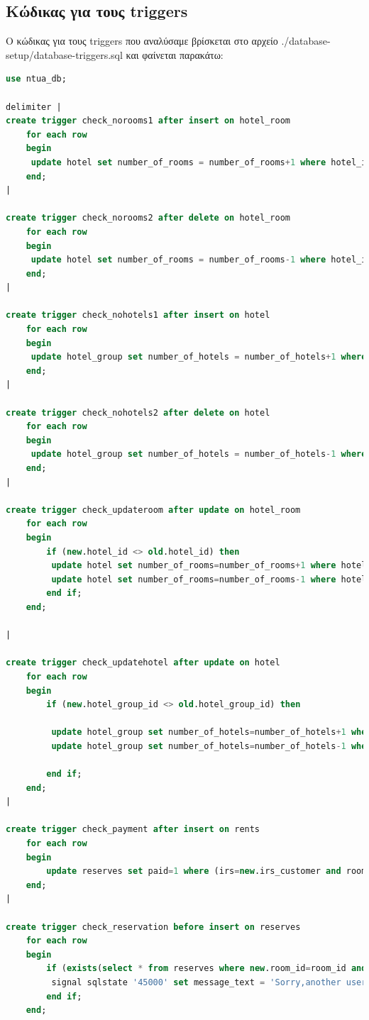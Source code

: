 \documentclass[a4paper,oneside, 11pt]{article}
\begin{document}
\subsection{Κώδικας για τους triggers}
Ο κώδικας για τους triggers που αναλύσαμε βρίσκεται στο αρχείο ./database-setup/database-triggers.sql και φαίνεται παρακάτω:

\begin{lstlisting}[language=SQL]
use ntua_db;

delimiter |
create trigger check_norooms1 after insert on hotel_room
	for each row
	begin
	 update hotel set number_of_rooms = number_of_rooms+1 where hotel_id=new.hotel_id;
	end;
|

create trigger check_norooms2 after delete on hotel_room
	for each row
	begin
	 update hotel set number_of_rooms = number_of_rooms-1 where hotel_id=old.hotel_id;
	end;
|

create trigger check_nohotels1 after insert on hotel
	for each row
	begin
	 update hotel_group set number_of_hotels = number_of_hotels+1 where hotel_group_id=new.hotel_group_id;
	end;
|

create trigger check_nohotels2 after delete on hotel
	for each row
	begin
	 update hotel_group set number_of_hotels = number_of_hotels-1 where hotel_group_id=old.hotel_group_id;
	end;
|

create trigger check_updateroom after update on hotel_room
	for each row
	begin
		if (new.hotel_id <> old.hotel_id) then
		 update hotel set number_of_rooms=number_of_rooms+1 where hotel_id=new.hotel_id;
		 update hotel set number_of_rooms=number_of_rooms-1 where hotel_id=old.hotel_id;
		end if;
	end;

|

create trigger check_updatehotel after update on hotel
	for each row
	begin
		if (new.hotel_group_id <> old.hotel_group_id) then
		
	 	 update hotel_group set number_of_hotels=number_of_hotels+1 where hotel_group_id=new.hotel_group_id;
	 	 update hotel_group set number_of_hotels=number_of_hotels-1 where hotel_group_id=old.hotel_group_id;
	 	
	 	end if;
	end;
|

create trigger check_payment after insert on rents
	for each row
	begin
		update reserves set paid=1 where (irs=new.irs_customer and room_id=new.room_id and start_date=new.start_date and finish_date=new.finish_date);
	end;
|

create trigger check_reservation before insert on reserves
	for each row
	begin
		if (exists(select * from reserves where new.room_id=room_id and not(new.finish_date<=start_date or new.start_date>=finish_date))) then
		 signal sqlstate '45000' set message_text = 'Sorry,another user booked the room';
		end if;
	end;


\end{lstlisting}
\end{document}
